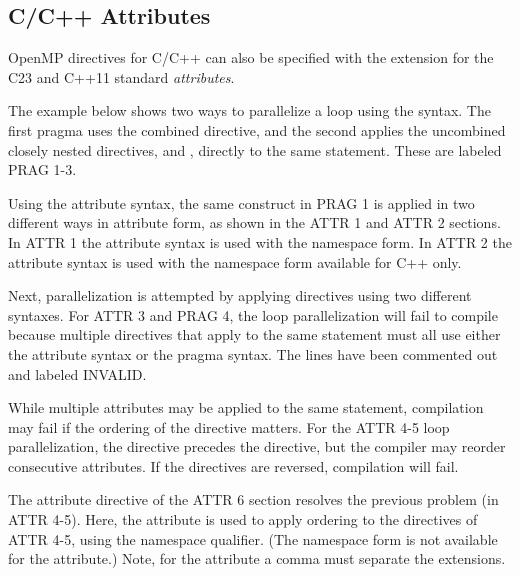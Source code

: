 \newpage
\begin{ccppspecific}[4ex]
\section{C/C++ Attributes}
\label{sec:attributes}

OpenMP directives for C/C++ can also be specified with 
the  extension for the C23 and C++11 standard \emph{attributes}.

The example below shows two ways to parallelize a  loop using the  syntax.
The first pragma uses the combined  directive, and the second
applies the uncombined closely nested directives,  and , directly to the same statement. 
These are labeled PRAG 1-3.

Using the attribute syntax, the same construct in PRAG 1
is applied in two different ways in attribute form, as shown in the ATTR 1 and ATTR 2 sections.
In ATTR 1 the attribute syntax is used with the  namespace form.
In ATTR 2 the attribute syntax is used with the  namespace
form available for C++ only.

Next, parallelization is attempted by applying directives using two different syntaxes.
For ATTR 3 and PRAG 4, the loop parallelization will fail to compile because multiple directives that
apply to the same statement must all use either the attribute syntax or the pragma syntax.
The lines have been commented out and labeled INVALID.

While multiple attributes may be applied to the same statement,
compilation may fail if the ordering of the directive matters.
For the ATTR 4-5 loop parallelization, the  directive precedes 
the  directive, but the compiler may reorder consecutive attributes.
If the directives are reversed, compilation will fail.

The attribute directive of the ATTR 6 section resolves the previous problem (in ATTR 4-5).
Here, the  attribute is used to apply ordering to the
directives of ATTR 4-5, using the  namespace qualifier. (The
 namespace form is not available for the  attribute.) 
Note, for the  attribute a comma must separate the  extensions.



\end{ccppspecific}
